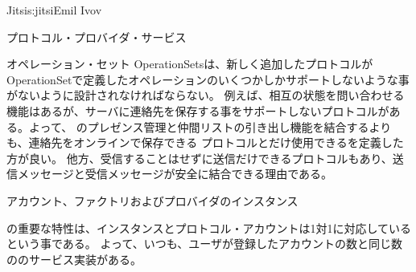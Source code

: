 \begin{aosachapter}{Jitsi}{s:jitsi}{Emil Ivov}
\begin{aosasect1}{プロトコル・プロバイダ・サービス}
\begin{aosasect2}{オペレーション・セット}
OperationSetsは、新しく追加したプロトコルがOperationSetで定義したオペレーションのいくつかしかサポートしないような事がないように設計されなければならない。
例えば、相互の状態を問い合わせる機能はあるが、サーバに連絡先を保存する事をサポートしないプロトコルがある。よって、
のプレゼンス管理と仲間リストの引き出し機能を結合するよりも、連絡先をオンラインで保存できる
プロトコルとだけ使用できるを定義した方が良い。
他方、受信することはせずに送信だけできるプロトコルもあり、送信メッセージと受信メッセージが安全に結合できる理由である。


\end{aosasect2}

\begin{aosasect2}{アカウント、ファクトリおよびプロバイダのインスタンス}

の重要な特性は、インスタンスとプロトコル・アカウントは1対1に対応しているという事である。
よって、いつも、ユーザが登録したアカウントの数と同じ数ののサービス実装がある。


\end{aosasect2}
\end{aosasect1}
\end{aosachapter}
